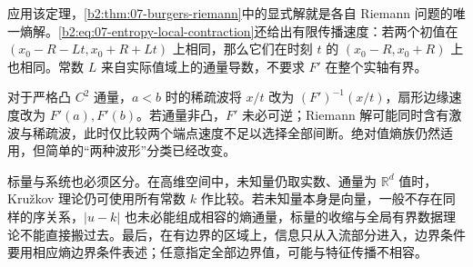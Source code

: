 应用该定理，\cref{b2:thm:07-burgers-riemann}中的显式解就是各自 Riemann 问题的唯一熵解。\eqref{b2:eq:07-entropy-local-contraction}还给出有限传播速度：若两个初值在 \((x_0-R-Lt,x_0+R+Lt)\) 上相同，那么它们在时刻 \(t\) 的 \((x_0-R,x_0+R)\) 上也相同。常数 \(L\) 来自实际值域上的通量导数，不要求 \(F'\) 在整个实轴有界。

对于严格凸 \(C^2\) 通量，\(a<b\) 时的稀疏波将 \(x/t\) 改为
\((F')^{-1}(x/t)\)，扇形边缘速度改为 \(F'(a),F'(b)\)。若通量非凸，\(F'\) 未必可逆；Riemann 解可能同时含有激波与稀疏波，此时仅比较两个端点速度不足以选择全部间断。绝对值熵族仍然适用，但简单的“两种波形”分类已经改变。

标量与系统也必须区分。在高维空间中，未知量仍取实数、通量为 \(\mathbb R^d\) 值时，Kružkov 理论仍可使用所有常数 \(k\) 作比较。若未知量本身是向量，一般不存在同样的序关系，\(|u-k|\) 也未必能组成相容的熵通量，标量的收缩与全局有界数据理论不能直接搬过去。最后，在有边界的区域上，信息只从入流部分进入，边界条件要用相应熵边界条件表述；任意指定全部边界值，可能与特征传播不相容。
